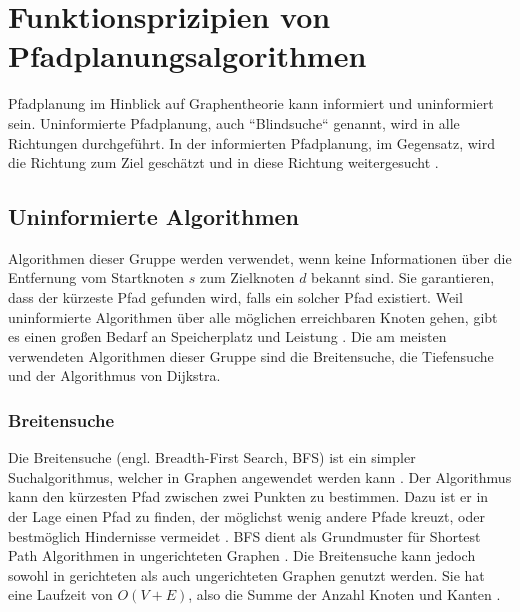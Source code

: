 
\chapter{Funktionsprizipien von Pfadplanungsalgorithmen}

Pfadplanung im Hinblick auf Graphentheorie kann informiert und uninformiert sein. Uninformierte Pfadplanung, auch ``Blindsuche`` genannt, wird in alle Richtungen durchgeführt. In der informierten Pfadplanung, im Gegensatz, wird die Richtung zum Ziel geschätzt und in diese Richtung weitergesucht \cite{Man18}. %

\section{Uninformierte Algorithmen}
Algorithmen dieser Gruppe werden verwendet, wenn keine Informationen über die Entfernung vom Startknoten $s$ zum Zielknoten $d$ bekannt sind. Sie garantieren, dass der kürzeste Pfad gefunden wird, falls ein solcher Pfad existiert. Weil uninformierte Algorithmen über alle möglichen erreichbaren Knoten gehen, gibt es einen großen Bedarf an Speicherplatz und Leistung \cite{Noo15}. Die am meisten verwendeten Algorithmen dieser Gruppe sind die Breitensuche, die Tiefensuche und der Algorithmus von Dijkstra.

\subsection{Breitensuche}

Die Breitensuche (engl. Breadth-First Search, BFS) ist ein simpler Suchalgorithmus, welcher in Graphen angewendet werden kann \cite[S.594]{Cormen.2009}. Der Algorithmus kann den kürzesten Pfad zwischen zwei Punkten zu bestimmen. Dazu ist er in der Lage einen Pfad zu finden, der möglichst wenig andere Pfade kreuzt, oder bestmöglich Hindernisse vermeidet \cite{Lee.1961}. BFS dient als Grundmuster für Shortest Path Algorithmen in ungerichteten Graphen \cite{Ottmann.2017}. Die Breitensuche kann jedoch sowohl in gerichteten als auch ungerichteten Graphen genutzt werden. Sie hat eine Laufzeit von $O(V + E)$, also die Summe der Anzahl Knoten und Kanten \cite[S.597]{Cormen.2009}.

